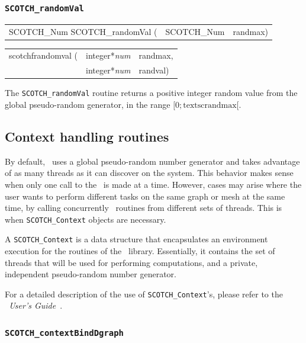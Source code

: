 \subsubsection{{\tt SCOTCH\_randomVal}}

\begin{itemize}
\progsyn

{\tt\begin{tabular}{l@{}ll}
SCOTCH\_Num SCOTCH\_randomVal ( & SCOTCH\_Num & randmax)
\end{tabular}}

{\tt\begin{tabular}{l@{}ll}
scotchfrandomval ( & integer*{\it num} & randmax, \\
                   & integer*{\it num} & randval)
\end{tabular}}

\progdes

The {\tt SCOTCH\_randomVal} routine returns a positive integer random
value from the global pseudo-random generator, in the range
$[0;\mbox{textsc{randmax}}[$.
\end{itemize}

\subsection{Context handling routines}
\label{sec-lib-context}

By default, \scotch\ uses a global pseudo-random number generator and
takes advantage of as many threads as it can discover on the
system. This behavior makes sense when only one call to the
\libscotch\ is made at a time. However, cases may arise where the user
wants to perform different tasks on the same graph or mesh at the same
time, by calling concurrently \libscotch\ routines from different sets
of threads. This is when \texttt{SCOTCH\_\lbt Context} objects are
necessary.

A \texttt{SCOTCH\_\lbt Context} is a data structure that encapsulates
an environment execution for the routines of the
\libscotch\ library. Essentially, it contains the set of threads that
will be used for performing computations, and a private, independent
pseudo-random number generator.

For a detailed description of the use of \texttt{SCOTCH\_\lbt Context}'s,
please refer to the {\it\scotch\ User's Guide}~\scotchcitesuser.

\subsubsection{\texttt{SCOTCH\_contextBindDgraph}}

